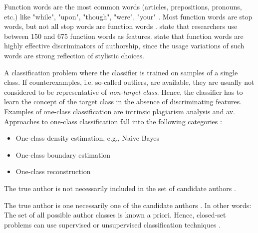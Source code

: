 \begin{definition}
    Function words are the most common words (articles, prepositions, pronouns, etc.) 
    like "while", "upon", "though", "were", "your" \cite{stamatatos_survey_2009,elmanarelbouanani_authorship_2014}.
    Most function words are stop words, but not all stop words are function words \cite{stein_intrinsic_2011}.
    \citet{elmanarelbouanani_authorship_2014} state that researchers use between 150 and 675 function words as features.
    \citet{abbasi_writeprints_2008} state that function words are highly effective discriminators of authorship, since 
    the usage variations of such words are strong reflection of stylistic choices.
\end{definition}

\begin{definition}
    A classification problem where the classifier is trained on samples of a single class.
    If counterexamples, i.e. so-called outliers, are available, they are usually not considered to be representative of \textit{non-target class}.
    Hence, the classifier has to learn the concept of the target class in the absence of discriminating features.
    Examples of one-class classification are intrinsic plagiarism analysis and \ac{av}.
    Approaches to one-class classification fall into the following categories \cite{stein_intrinsic_2011}:
    \begin{itemize}
        \item One-class density estimation, e.g., Naive Bayes
        \item One-class boundary estimation
        \item One-class reconstruction
    \end{itemize}
\end{definition}

\begin{definition}
    The true author is not necessarily included in the set of candidate authors \cite{stamatatos_survey_2009,barlas_cross_domain_2020}.
\end{definition}

\begin{definition}
    The true author is one necessarily one of the candidate authors \cite{stamatatos_survey_2009,koppel_authorship_2011,barlas_cross_domain_2020,boenninghoff_o2d2_2021}.
    In other words: The set of all possible author classes is known a priori.
    Hence, closed-set problems can use supervised or unsupervised classification techniques \cite{abbasi_writeprints_2008}.
\end{definition}

